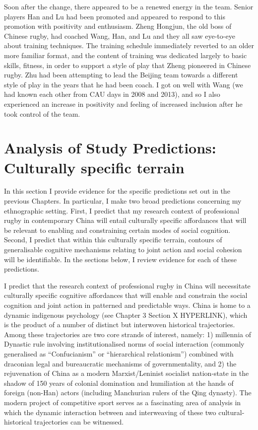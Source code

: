 \begin{CJK}{UTF8}{gbsn}
  Soon after the change, there appeared to be a renewed energy in the team.  Senior players Han and Lu had been promoted and appeared to respond to this promotion with positivity and enthusiasm.  Zheng Hongjun, the old boss of Chinese rugby, had coached Wang, Han, and Lu and they all saw eye-to-eye about training techniques.  The training schedule immediately reverted to an older more familiar format, and the content of training was dedicated largely to basic skills, fitness, in order to support a style of play that Zheng pioneered in Chinese rugby.  Zhu had been attempting to lead the Beijing team towards a different style of play in the years that he had been coach.  I got on well with Wang (we had known each other from CAU days in 2008 and 2013), and so I also experienced an increase in positivity and feeling of increased inclusion after he took control of the team.







  \section{Analysis of Study Predictions: Culturally specific terrain}

  In this section I provide evidence for the specific predictions set out in the previous Chapters.  In particular, I make two broad predictions concerning my ethnographic setting.  First, I predict that my research context of professional rugby in contemporary China will entail culturally specific affordances that will be relevant to enabling and constraining certain modes of social cognition.  Second, I predict that within this culturally specific terrain, contours of generalisable cognitive mechanisms relating to joint action and social cohesion will be identifiable.  In the sections below, I review evidence for each of these predictions.

  I predict that the research context of professional rugby in China will necessitate culturally specific cognitive affordances that will enable and constrain the social cognition and joint action in patterned and predictable ways.  China is home to a dynamic indigenous psychology (see Chapter 3 Section X HYPERLINK), which is the product of a number of distinct but interwoven historical trajectories.  Among these trajectories are two core strands of interest, namely: 1) millennia of Dynastic rule involving institutionalised norms of social interaction (commonly generalised as ``Confucianism'' or ``hierarchical relationism'') combined with draconian legal and bureaucratic mechanisms of governmentality, and 2) the rejuvenation of China as a modern Marxist/Leninist socialist nation-state in the shadow of 150 years of colonial domination and humiliation at the hands of foreign (non-Han) actors (including Manchurian rulers of the Qing dynasty).  The modern project of competitive sport serves as a fascinating area of analysis in which the dynamic interaction between and interweaving of these two cultural-historical trajectories can be witnessed.


\end{CJK}
